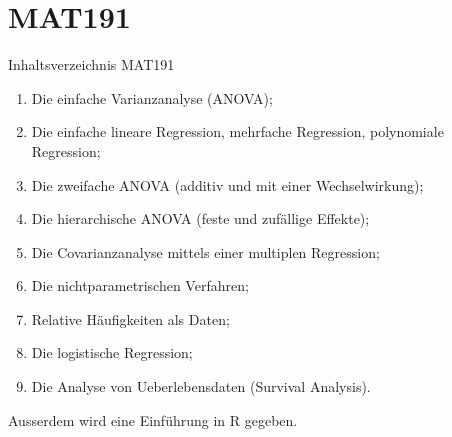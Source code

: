 \documentclass[handout]{beamer}
\begin{document}
\appendix
\section*{MAT191}
\begin{frame}{Inhaltsverzeichnis MAT191}
\begin{enumerate}
\item Die einfache Varianzanalyse (ANOVA);
\item Die einfache lineare Regression, mehrfache Regression, polynomiale Regression;
\item Die zweifache ANOVA (additiv und mit einer Wechselwirkung);
\item Die hierarchische ANOVA (feste und zufällige Effekte);
\item Die Covarianzanalyse mittels einer multiplen Regression;
\item Die nichtparametrischen Verfahren;
\item Relative Häufigkeiten als Daten;
\item Die logistische Regression;
\item Die Analyse von Ueberlebensdaten (Survival Analysis).
\end{enumerate}
Ausserdem wird eine Einführung in R gegeben.
\end{frame}
\end{document}
